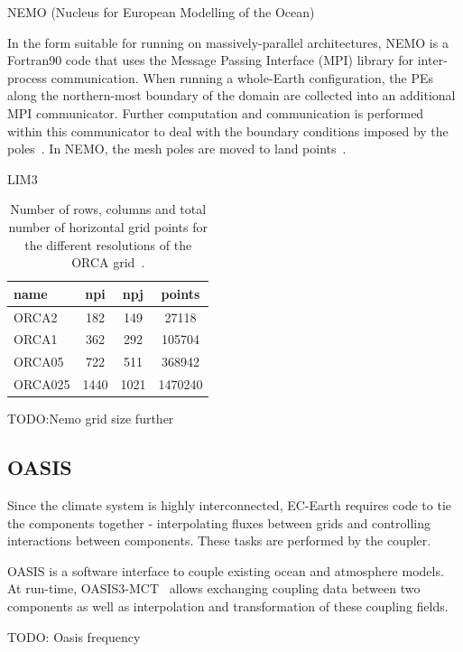 NEMO (Nucleus for European Modelling of the Ocean)~\cite{nemo-book36}

In the form suitable for running on massively-parallel architectures, NEMO is a Fortran90 code that uses the Message Passing Interface (MPI) library for inter-process
communication. When running a whole-Earth configuration, the PEs along the northern-most boundary of the domain are collected into an additional MPI communicator. Further
computation and communication is performed within this communicator to deal with the boundary conditions imposed by the poles~\cite{nemo-report}. In NEMO, the mesh poles are moved to land points~\cite{ref1}.

LIM3~\cite{lim36,gmd-8-2991-2015}



\begin{table}[h!]
\centering
\begin{tabular}{|l|c|c|c|}
    \hline 
    name    & npi  & npj  & points  \\
    \hline   
    ORCA2   & 182  & 149  & 27118   \\
    ORCA1   & 362  & 292  & 105704  \\
    ORCA05  & 722  & 511  & 368942  \\
    ORCA025 & 1440 & 1021 & 1470240 \\
    \hline
\end{tabular}
\caption{Number of rows, columns and total number of horizontal grid points for the different resolutions of the ORCA grid~\cite{oriol14}.}
\label{tab:nemo-grid}
\end{table}

TODO:Nemo grid size further

\subsection{OASIS}
Since the climate system is highly interconnected, EC-Earth requires code to tie the components together - interpolating fluxes between grids and controlling interactions between components. These tasks are performed by the coupler.

OASIS is a software interface to couple existing ocean and atmosphere models. At run-time, OASIS3-MCT~\cite{oasis3-mct} allows exchanging coupling data between two components as well as interpolation and transformation of these coupling fields. 

TODO: Oasis frequency


